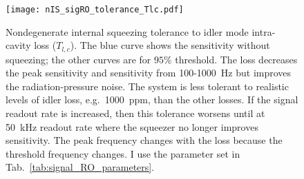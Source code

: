 \begin{figure}
    \centering
    \texttt{[image: nIS\_sigRO\_tolerance\_Tlc.pdf]}
    \caption{Nondegenerate internal squeezing tolerance to idler mode intra-cavity loss ($T_{l,c}$). The blue curve shows the sensitivity without squeezing; the other curves are for $95\%$ threshold.
    The loss decreases the peak sensitivity and sensitivity from 100-1000~Hz but improves the radiation-pressure noise. The system is less tolerant to realistic levels of idler loss, e.g.\ 1000~ppm, than the other losses. If the signal readout rate is increased, then this tolerance worsens until at 50~kHz readout rate where the squeezer no longer improves sensitivity. The peak frequency changes with the loss because the threshold frequency changes. I use the parameter set in Tab.~\ref{tab:signal_RO_parameters}.}
    \label{fig:nIS_sigRO_tolerance_Tlc}
\end{figure}

